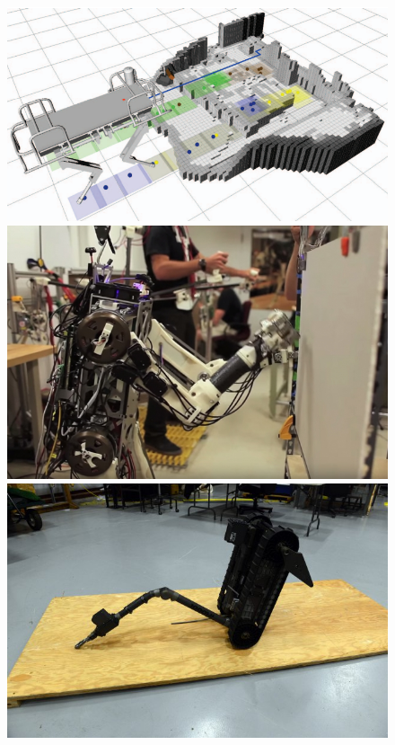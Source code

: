 \documentclass[11pt]{beamer}
\begin{document}
\begin{frame}
  \begin{figure}
  \centering
  \hspace*{-5mm}
  \includegraphics[scale=.14]{feet_sequence.png}
  \includegraphics[scale=.14]{mit_teleop.jpg}
  \includegraphics[scale=.14]{sr_robot_general.jpg} 
  \end{figure}
  \end{frame}
\end{document}
